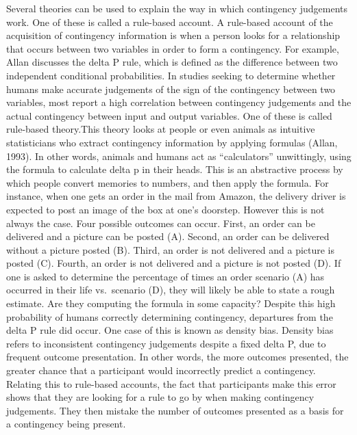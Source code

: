 \documentclass[
  english,
  man,floatsintext]{apa6}
\begin{document}
Several theories can be used to explain the way in which contingency judgements work. One of these is called a rule-based account. A rule-based account of the acquisition of contingency information is when a person looks for a relationship that occurs between two variables in order to form a contingency. For example, Allan discusses the delta P rule, which is defined as the difference between two independent conditional probabilities. In studies seeking to determine whether humans make accurate judgements of the sign of the contingency between two variables, most report a high correlation between contingency judgements and the actual contingency between input and output variables. One of these is called rule-based theory.This theory looks at people or even animals as intuitive statisticians who extract contingency information by applying formulas (Allan, 1993). In other words, animals and humans act as \enquote{calculators} unwittingly, using the formula to calculate delta p in their heads. This is an abstractive process by which people convert memories to numbers, and then apply the formula. For instance, when one gets an order in the mail from Amazon, the delivery driver is expected to post an image of the box at one's doorstep. However this is not always the case. Four possible outcomes can occur. First, an order can be delivered and a picture can be posted (A). Second, an order can be delivered without a picture posted (B). Third, an order is not delivered and a picture is posted (C). Fourth, an order is not delivered and a picture is not posted (D). If one is asked to determine the percentage of times an order scenario (A) has occurred in their life vs.~scenario (D), they will likely be able to state a rough estimate. Are they computing the formula in some capacity? Despite this high probability of humans correctly determining contingency, departures from the delta P rule did occur. One case of this is known as density bias. Density bias refers to inconsistent contingency judgements despite a fixed delta P, due to frequent outcome presentation. In other words, the more outcomes presented, the greater chance that a participant would incorrectly predict a contingency. Relating this to rule-based accounts, the fact that participants make this error shows that they are looking for a rule to go by when making contingency judgements. They then mistake the number of outcomes presented as a basis for a contingency being present.
\end{document}
